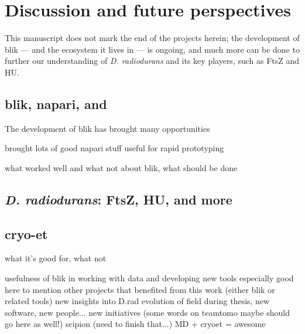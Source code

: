 \chapter{Discussion and future perspectives}\label{future}

This manuscript does not mark the end of the projects herein; the development of blik --- and the ecosystem it lives in --- is ongoing, and much more can be done to further our understanding of \textit{D. radiodurans} and its key players, such as FtsZ and HU.

\localtableofcontents

\section{blik, napari, and }

The development of blik has brought many opportunities

brought lots of good napari stuff
useful for rapid prototyping

what worked well and what not about blik, what should be done

\section{\textit{D. radiodurans}: FtsZ, HU, and more}


\section{cryo-et}

what it's good for, what not

\localtableofcontents

\begin{outline}
\1 usefulness of blik in working with data and developing new tools
    \2 especially good here to mention other projects that benefited from this work (either blik or related tools)
\1 new insights into D.rad
\1 evolution of field during thesis, new software, new people... new initiatives (some words on teamtomo maybe should go here as well!)
\1 scipion (need to finish that...)
\1 MD + cryoet = awesome
\end{outline}
